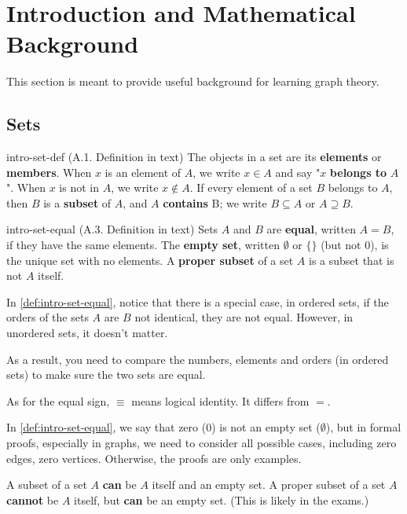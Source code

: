 \documentclass[../src/handouts/main.tex]{subfiles}
\begin{document}
\section{Introduction and Mathematical Background}

This section is meant to provide useful background for learning graph theory.

\subsection{Sets}

\begin{definition}{}{intro-set-def}
  (A.1. Definition in text)
  The objects in a set are its \textbf{elements} or \textbf{members}.
  When $x$ is an element of $A$, we write $x \in A$ and say "$x$ \textbf{belongs to} $A$".
  When $x$ is not in $A$, we write $x \notin A$.
  If every element of a set $B$ belongs to $A$, then $B$ is a \textbf{subset} of $A$, and $A$ \textbf{contains} B; we write $B \subseteq A$ or $A \supseteq B$.
\end{definition}

\begin{definition}{}{intro-set-equal}
  (A.3. Definition in text)
  Sets $A$ and $B$ are \textbf{equal}, written $A = B$, if they have the same elements. The \textbf{empty set}, written $\emptyset$ or $\lbrace \rbrace$ (but not 0), is the unique set with no elements. A \textbf{proper subset} of a set $A$ is a subset that is not $A$ itself.
\end{definition}

In \cref{def:intro-set-equal}, notice that there is a special case, in ordered sets, if the orders of the sets $A$ are $B$ not identical, they are not equal. However, in unordered sets, it doesn't matter.

As a result, you need to compare the numbers, elements and orders (in ordered sets) to make sure the two sets are equal.

As for the equal sign, $\equiv$ means logical identity. It differs from $=$.

In \cref{def:intro-set-equal}, we say that zero (0) is not an empty set ($\emptyset$), but in formal proofs, especially in graphs, we need to consider all possible cases, including zero edges, zero vertices. Otherwise, the proofs are only examples.

A subset of a set $A$ \textbf{can} be $A$ itself and an empty set. A proper subset of a set $A$ \textbf{cannot} be $A$ itself, but \textbf{can} be an empty set. (This is likely in the exams.)
\end{document}
